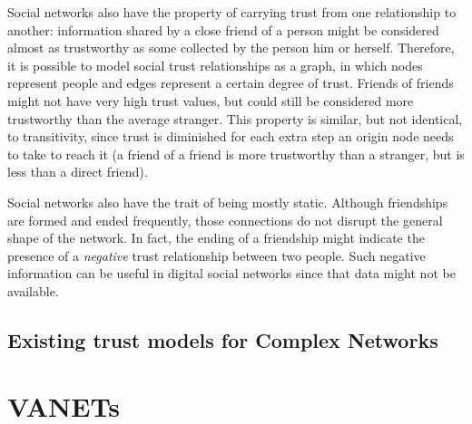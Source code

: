 \documentclass{article}
\begin{document}
Social networks also have the property of carrying trust from one relationship to another:
information shared by a close friend of a person might be considered almost as trustworthy as some collected by the person him or herself.
Therefore, it is possible to model social trust relationships as a graph, in which nodes represent people and edges represent a certain degree of trust.
Friends of friends \cite{boissevain1974friends} might not have very high trust values, but could still be considered more trustworthy than the average stranger.
This property is similar, but not identical, to transitivity, since trust is diminished for each extra step an origin node needs to take to reach it (a friend of a friend is more trustworthy than a stranger, but is less than a direct friend).

Social networks also have the trait of being mostly static.
Although friendships are formed and ended frequently, those connections do not disrupt the general shape of the network.
In fact, the ending of a friendship might indicate the presence of a \textit{negative} trust relationship between two people.
Such negative information can be useful in digital social networks since that data might not be available.

\subsection{Existing trust models for Complex Networks}






\section{VANETs}

\end{document}
